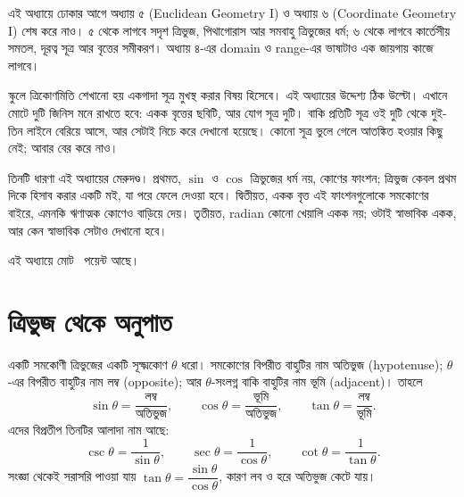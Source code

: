 \documentclass[11pt]{article}
\begin{document}

\noindent
এই অধ্যায়ে ঢোকার আগে অধ্যায় ৫ (Euclidean Geometry I) ও অধ্যায় ৬
(Coordinate Geometry I) শেষ করে নাও। ৫ থেকে লাগবে সদৃশ ত্রিভুজ, পিথাগোরাস আর
সমবাহু ত্রিভুজের ধর্ম; ৬ থেকে লাগবে কার্তেসীয় সমতল, দূরত্ব সূত্র আর বৃত্তের
সমীকরণ। অধ্যায় ৪-এর domain ও range-এর ভাষাটাও এক জায়গায় কাজে লাগবে।

স্কুলে ত্রিকোণমিতি শেখানো হয় একগাদা সূত্র মুখস্থ করার বিষয় হিসেবে। এই
অধ্যায়ের উদ্দেশ্য ঠিক উল্টো। এখানে মোটে দুটি জিনিস মনে রাখতে হবে: একক
বৃত্তের ছবিটি, আর যোগ সূত্র দুটি। বাকি প্রতিটি সূত্র ওই দুটি থেকে দুই-তিন
লাইনে বেরিয়ে আসে, আর সেটাই নিচে করে দেখানো হয়েছে। কোনো সূত্র ভুলে গেলে
আতঙ্কিত হওয়ার কিছু নেই; আবার বের করে নাও।

তিনটি ধারণা এই অধ্যায়ের মেরুদণ্ড। প্রথমত, $\sin$ ও $\cos$ ত্রিভুজের ধর্ম
নয়, কোণের ফাংশন; ত্রিভুজ কেবল প্রথম দিকে হিসাব করার একটি মই, যা পরে ফেলে দেওয়া
হবে। দ্বিতীয়ত, একক বৃত্ত এই ফাংশনগুলোকে সমকোণের বাইরে, এমনকি ঋণাত্মক কোণেও
বাড়িয়ে দেয়। তৃতীয়ত, radian কোনো খেয়ালি একক নয়; ওটাই স্বাভাবিক একক, আর কেন
স্বাভাবিক সেটাও দেখানো হবে।

এই অধ্যায়ে মোট \totalpoints\ পয়েন্ট আছে।

\section{ত্রিভুজ থেকে অনুপাত}

\begin{idea}[সমকোণী ত্রিভুজে ছয়টি অনুপাত]
একটি সমকোণী ত্রিভুজের একটি সূক্ষ্মকোণ $\theta$ ধরো। সমকোণের বিপরীত বাহুটির নাম
অতিভুজ (hypotenuse); $\theta$-এর বিপরীত বাহুটির নাম লম্ব (opposite); আর
$\theta$-সংলগ্ন বাকি বাহুটির নাম ভূমি (adjacent)। তাহলে
\[
  \sin\theta = \frac{\text{লম্ব}}{\text{অতিভুজ}}, \qquad
  \cos\theta = \frac{\text{ভূমি}}{\text{অতিভুজ}}, \qquad
  \tan\theta = \frac{\text{লম্ব}}{\text{ভূমি}} .
\]
এদের বিপ্রতীপ তিনটির আলাদা নাম আছে:
\[
  \csc\theta = \frac{1}{\sin\theta}, \qquad
  \sec\theta = \frac{1}{\cos\theta}, \qquad
  \cot\theta = \frac{1}{\tan\theta} .
\]
সংজ্ঞা থেকেই সরাসরি পাওয়া যায় $\tan\theta = \dfrac{\sin\theta}{\cos\theta}$,
কারণ লব ও হরে অতিভুজ কেটে যায়।
\end{idea}

\begin{center}
\end{center}
\end{document}
